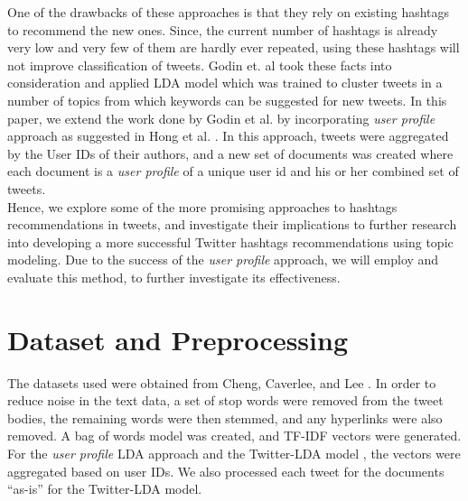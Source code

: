\documentclass{acm_proc_article-sp}
\begin{document}
\hspace*{5mm}One of the drawbacks of these approaches is that they rely on existing hashtags to recommend the new ones. Since, the current number of hashtags is already very low and very few of them are hardly ever repeated, using these hashtags will not improve classification of tweets. \cite{godin2013using} Godin et. al took these facts into consideration and applied LDA model which was trained to cluster tweets in a number of topics from which keywords can be suggested for new tweets. In this paper, we extend the work done by Godin et al.\cite{godin2013using} by incorporating \textit{user profile} approach as suggested in Hong et al. \cite{hong2010empirical}. In this approach, tweets were aggregated by the User IDs of their authors, and a new set of documents was created where each document is a \textit{user profile} of a unique user id and his or her combined set of tweets.\\
\hspace*{5mm}Hence, we explore some of the more promising approaches to hashtags recommendations in tweets, and investigate their implications to further research into developing a more successful Twitter hashtags recommendations using topic modeling. Due to the success of the \textit{user profile} approach, we will employ and evaluate this method, to further investigate its effectiveness.\\

\section{Dataset and Preprocessing}
\hspace*{5mm}The datasets used were obtained from Cheng, Caverlee, and Lee \cite{cheng2010content}. In order to reduce noise in the text data, a set of stop words were removed from the tweet bodies, the remaining words were then stemmed, and any hyperlinks were also removed. A bag of words model was created, and TF-IDF vectors were generated. For the \textit{user profile} LDA approach \cite{hong2010empirical} and the Twitter-LDA model \cite{zhao2011comparing}, the vectors were aggregated based on user IDs. We also processed each tweet for the documents ``as-is'' for the Twitter-LDA model.
\end{document}
